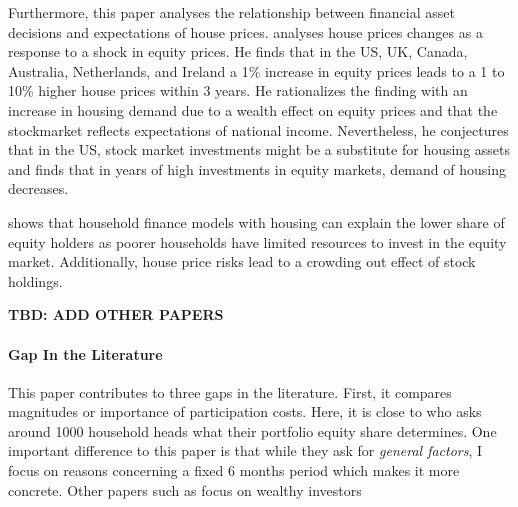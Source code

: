 \documentclass[ProjectABM]{subfiles}
\begin{document}

Furthermore, this paper analyses the relationship between financial asset decisions and expectations of house prices. \cite{sutton2002houseprices} analyses house prices changes as a response to a shock in equity prices. He finds that in the US, UK, Canada, Australia, Netherlands, and Ireland a 1\% increase in equity prices leads to a 1 to 10\% higher house prices within 3 years. He rationalizes the finding with an increase in housing demand due to a wealth effect on equity prices and that the stockmarket reflects expectations of national income. Nevertheless, he conjectures that in the US, stock market investments might be a substitute for housing assets and finds that in years of high investments in equity markets, demand of housing decreases. %

\cite{cocco2005housing} shows that household finance models with housing can explain the lower share of equity holders as poorer households have limited resources to invest in the equity market. Additionally, house price risks lead to a crowding out effect of stock holdings.






\textbf{TBD: ADD OTHER PAPERS}

\paragraph{Gap In the Literature}
This paper contributes to three gaps in the literature. First, it compares magnitudes or importance of participation costs. Here, it is close to \cite{choi_2020} who asks around 1000 household heads what their portfolio equity share determines. One important difference to this paper is that while they ask for \textit{general factors}, I focus on reasons concerning a fixed 6 months period which makes it more concrete. Other papers such as \cite{bender_et_al_2019} focus on wealthy investors
\end{document}
